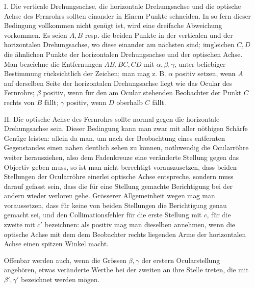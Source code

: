 I. Die verticale Drehungsachse, die horizontale Drehungsachse und die optische Achse des Fernrohrs sollten einander in Einem Punkte schneiden. In so fern dieser Bedingung vollkommen nicht genügt ist, wird eine dreifache Abweichung vorkommen. Es seien $A,B$ resp. die beiden Punkte in der verticalen und der horizontalen Drehungsachse, wo diese einander am nächsten sind; imgleichen $C,D$ die ähnlichen Punkte der horizontalen Drehungsachse und der optischen Achse. Man bezeichne die Entfernungen $AB,BC,CD$ mit $\alpha,\beta,\gamma$, unter beliebiger Bestimmung rücksichtlich der Zeichen; man mag z. B. $\alpha$ positiv setzen, wenn $A$ auf derselben Seite der horizontalen Drehungsachse liegt wie das Ocular des Fernrohrs; $\beta$ positiv, wenn für den am Ocular stehenden Beobachter der Punkt $C$ rechts von $B$ fällt; $\gamma$ positiv, wenn $D$ oberhalb $C$ fällt.

II. Die optische Achse des Fernrohrs sollte normal gegen die horizontale Drehungsachse sein. Dieser Bedingung kann man zwar mit aller nöthigen Schärfe Genüge leisten: allein da man, um nach der Beobachtung eines entfernten Gegenstandes einen nahen deutlich sehen zu können, nothwendig die Ocularröhre weiter herausziehen, also dem Fadenkreuze eine veränderte Stellung gegen das Objectiv geben muss, so ist man nicht berechtigt vorauszusetzen, dass beiden Stellungen der Ocularröhre einerlei optische Achse entspreche, sondern muss darauf gefasst sein, dass die für eine Stellung gemachte Berichtigung bei der andern wieder verloren gehe. Grösserer Allgemeinheit wegen mag man voraussetzen, dass für keine von beiden Stellungen die Berichtigung genau gemacht sei, und den Collimationsfehler für die erste Stellung mit $c$, für die zweite mit $c'$ bezeichnen: als positiv mag man dieselben annehmen, wenn die optische Achse mit dem dem Beobachter rechts liegenden Arme der horizontalen Achse einen spitzen Winkel macht.

Offenbar werden auch, wenn die Grössen $\beta,\gamma$ der erstern Ocularstellung angehören, etwas veränderte Werthe bei der zweiten an ihre Stelle treten, die mit $\beta',\gamma'$ bezeichnet werden mögen.

